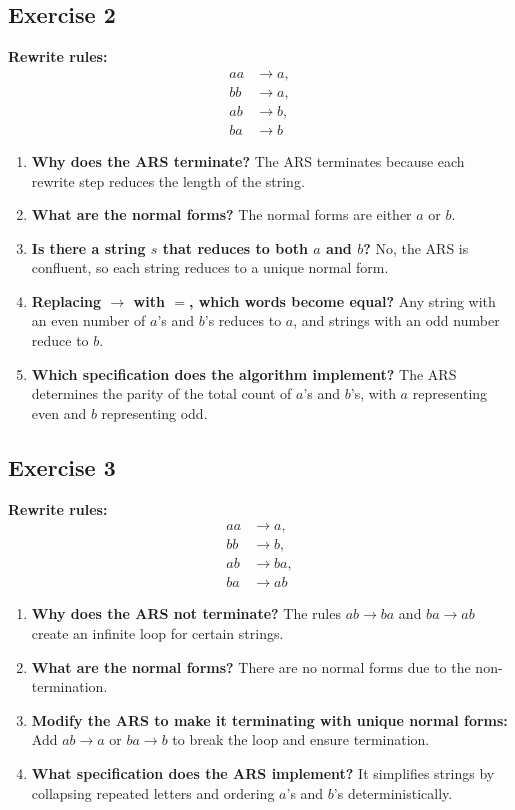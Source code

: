 \documentclass{article}
\theoremstyle{theorem}
\theoremstyle{definition}
\theoremstyle{remark}
\begin{document}
\subsection*{Exercise 2}
\textbf{Rewrite rules:} 
\[
\begin{aligned}
    aa &\to a, \\
    bb &\to a, \\
    ab &\to b, \\
    ba &\to b
\end{aligned}
\]
\begin{enumerate}
    \item \textbf{Why does the ARS terminate?} The ARS terminates because each rewrite step reduces the length of the string.
    \item \textbf{What are the normal forms?} The normal forms are either \( a \) or \( b \).
    \item \textbf{Is there a string \( s \) that reduces to both \( a \) and \( b \)?} No, the ARS is confluent, so each string reduces to a unique normal form.
    \item \textbf{Replacing \( \to \) with \( = \), which words become equal?} Any string with an even number of \( a \)'s and \( b \)'s reduces to \( a \), and strings with an odd number reduce to \( b \).
    \item \textbf{Which specification does the algorithm implement?} The ARS determines the parity of the total count of \( a \)'s and \( b \)'s, with \( a \) representing even and \( b \) representing odd.
\end{enumerate}

\subsection*{Exercise 3}
\textbf{Rewrite rules:} 
\[
\begin{aligned}
    aa &\to a, \\
    bb &\to b, \\
    ab &\to ba, \\
    ba &\to ab
\end{aligned}
\]
\begin{enumerate}
    \item \textbf{Why does the ARS not terminate?} The rules \( ab \to ba \) and \( ba \to ab \) create an infinite loop for certain strings.
    \item \textbf{What are the normal forms?} There are no normal forms due to the non-termination.
    \item \textbf{Modify the ARS to make it terminating with unique normal forms:} Add \( ab \to a \) or \( ba \to b \) to break the loop and ensure termination.
    \item \textbf{What specification does the ARS implement?} It simplifies strings by collapsing repeated letters and ordering \( a \)'s and \( b \)'s deterministically.
\end{enumerate}
\end{document}
